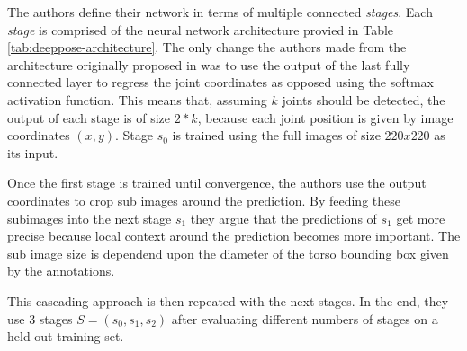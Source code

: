 The authors define their network in terms of multiple connected \textit{stages}.
Each \textit{stage} is comprised of the neural network architecture provied in Table \ref{tab:deeppose-architecture}.
The only change the authors made from the architecture originally proposed in \cite{krizhevsky_imagenet_2012} was to use the output of the last fully connected layer to regress the joint coordinates as opposed using the softmax activation function.
This means that, assuming $k$ joints should be detected, the output of each stage is of size $2 * k$, because each joint position is given by image coordinates $(x, y)$.
Stage $s_0$ is trained using the full images of size $220 x 220$ as its input.

Once the first stage is trained until convergence, the authors use the output coordinates to crop sub images around the prediction.
By feeding these subimages into the next stage $s_1$ they argue that the predictions of $s_1$ get more precise because local context around the prediction becomes more important.
The sub image size is dependend upon the diameter of the torso bounding box given by the annotations.

This cascading approach is then repeated with the next stages.
In the end, they use $3$ stages $S = (s_0, s_1, s_2)$ after evaluating different numbers of stages on a held-out training set.

\begin{table}[]
    \centering
    \caption{One \textit{stage} of the DeepPose network. Architecture based on \cite{krizhevsky_imagenet_2012}.}
    \label{tab:deeppose-architecture}
\end{table}

